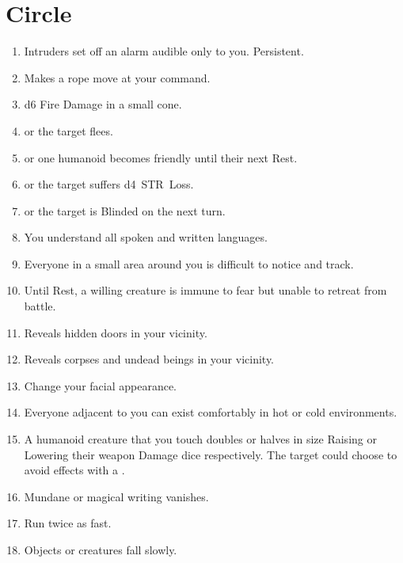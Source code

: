 \documentclass[itdr]{subfiles}
\begin{document}

\vfill
\break

\section{ Circle}
\def \spellcircle {1}
\begin{enumerate}
	\item {} Intruders set off an alarm audible only to you. Persistent.
	\item {} Makes a rope move at your command.
	\item {} d6 Fire Damage in a small cone.
	\item {}  or the target flees.
	\item {}  or one humanoid becomes friendly until their next Rest.
	\item {}  or the target suffers d4~STR~Loss.
	\item {}  or the target is Blinded on the next turn.
	\item {} You understand all spoken and written languages.
	\item {} Everyone in a small area around you is difficult to notice and track.
	\item {} Until Rest, a willing creature is immune to fear but unable to retreat from battle.
	\item {} Reveals hidden doors in your vicinity.
	\item {} Reveals corpses and undead beings in your vicinity.
	\item {} Change your facial appearance.
	\item {} Everyone adjacent to you can exist comfortably in hot or cold environments.
	\item {} A humanoid creature that you touch doubles or halves in size Raising or Lowering their weapon Damage dice respectively. The target could choose to avoid effects with a .
	\item {} Mundane or magical writing vanishes.
	\item {} Run twice as fast.
	\item {} Objects or creatures fall slowly.

\end{enumerate}
\end{document}

